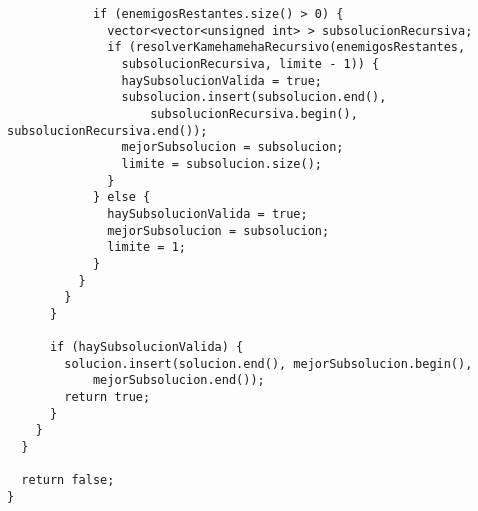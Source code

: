 \begin{lstlisting}
            if (enemigosRestantes.size() > 0) {
              vector<vector<unsigned int> > subsolucionRecursiva;
              if (resolverKamehamehaRecursivo(enemigosRestantes, 
              	subsolucionRecursiva, limite - 1)) {
                haySubsolucionValida = true;
                subsolucion.insert(subsolucion.end(), 
                	subsolucionRecursiva.begin(), subsolucionRecursiva.end());
                mejorSubsolucion = subsolucion;
                limite = subsolucion.size();
              }
            } else {
              haySubsolucionValida = true;
              mejorSubsolucion = subsolucion;
              limite = 1;
            }
          }
        }
      }

      if (haySubsolucionValida) {
        solucion.insert(solucion.end(), mejorSubsolucion.begin(), 
        	mejorSubsolucion.end());
        return true;
      }
    }
  }

  return false;
}
\end{lstlisting}

